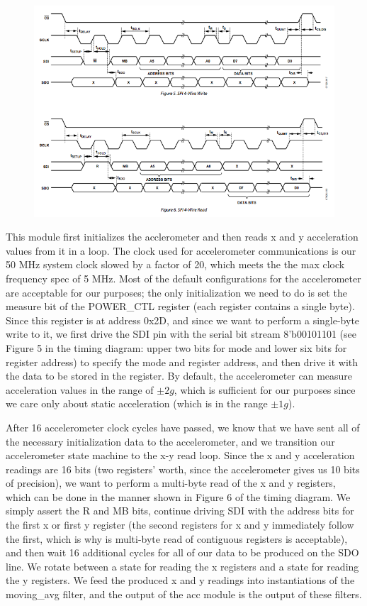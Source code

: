 \documentclass{article}
\begin{document}
\begin{center}
\begin{figure}[H]
\includegraphics[width=\textwidth]{./img/acc_timing}
\end{figure}
\end{center}

This module first initializes the acclerometer and then reads x and y acceleration values from it in a loop. The clock used for accelerometer communications is our 50 MHz system clock slowed by a factor of 20, which meets the the max clock frequency spec of 5 MHz. Most of the default configurations for the accelerometer are acceptable for our purposes; the only initialization we need to do is set the measure bit of the POWER\_CTL register (each register contains a single byte). Since this register is at address 0x2D, and since we want to perform a single-byte write to it, we first drive the SDI pin with the serial bit stream 8'b00101101 (see Figure 5 in the timing diagram: upper two bits for mode and lower six bits for register address) to specify the mode and register address, and then drive it with the data to be stored in the register. By default, the accelerometer can measure acceleration values in the range of $\pm 2g$, which is sufficient for our purposes since we care only about static acceleration (which is in the range $\pm 1g$).

After 16 accelerometer clock cycles have passed, we know that we have sent all of the necessary initialization data to the accelerometer, and we transition our accelerometer state machine to the x-y read loop. Since the x and y acceleration readings are 16 bits (two registers' worth, since the accelerometer gives us 10 bits of precision), we want to perform a multi-byte read of the x and y registers, which can be done in the manner shown in Figure 6 of the timing diagram. We simply assert the R and MB bits, continue driving SDI with the address bits for the first x or first y register (the second registers for x and y immediately follow the first, which is why is multi-byte read of contiguous registers is acceptable), and then wait 16 additional cycles for all of our data to be produced on the SDO line. We rotate between a state for reading the x registers and a state for reading the y registers. We feed the produced x and y readings into instantiations of the moving\_avg filter, and the output of the acc module is the output of these filters.
\end{document}
